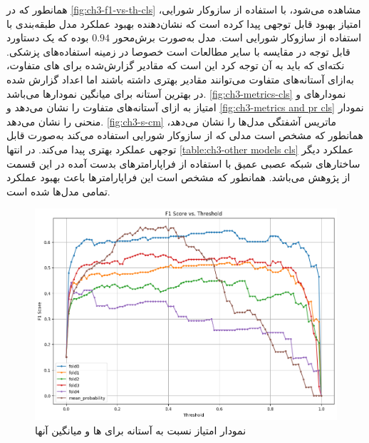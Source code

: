 همانطور که در 
\autoref{fig:ch3-f1-vs-th-cls}
 مشاهده می‌شود، با استفاده از سازوکار شورایی، امتیاز  بهبود قابل توجهی پیدا کرده است که نشان‌دهنده بهبود عملکرد مدل طبقه‌بندی با استفاده از سازوکار شورایی است.
  مدل به‌صورت برش‌محور 
 $0.94$ 
 بوده که یک دستاورد قابل توجه در مقایسه با سایر مطالعات است خصوصا در زمینه استفاده‌های پزشکی. نکته‌ای که باید به آن توجه کرد این است که مقادیر گزارش‌شده برای
 های 
 متفاوت،‌ به‌ازای آستانه‌های متفاوت می‌توانند مقادیر بهتری داشته باشند اما اعداد گزارش شده در بهترین آستانه برای میانگین نمودارها می‌باشد.
\autoref{fig:ch3-metrics-cls}
نمودارهای
			 و امتیاز
			به ازای آستانه‌های متفاوت را نشان می‌دهد و 
\autoref{fig:ch3-metrics and pr cls}
نمودار منحنی 
را نشان می‌دهد.
\autoref{fig:ch3-s-cm}
ماتریس آشفتگی مدل‌ها را نشان می‌دهد،‌ همانطور که مشخص است مدلی که از سازوکار شورایی استفاده می‌کند به‌صورت قابل توجهی عملکرد بهتری پیدا می‌کند. در انتها 
\autoref{table:ch3-other models cls}
عملکرد دیگر ساختارهای شبکه عصبی عمیق با استفاده از فراپارامترهای بدست آمده در این قسمت از پژوهش می‌باشد. همانطور که مشخص است این فراپارامتر‌ها باعث بهبود عملکرد تمامی مدل‌ها شده است.
\begin{figure}[h]
\centering
\includegraphics[width=1.0\linewidth]{Images/Chapter3/f1-vs-th-cls}
\caption{نمودار امتیاز  نسبت به آستانه برای ها و میانگین آنها}
\label{fig:ch3-f1-vs-th-cls}

\end{figure}


